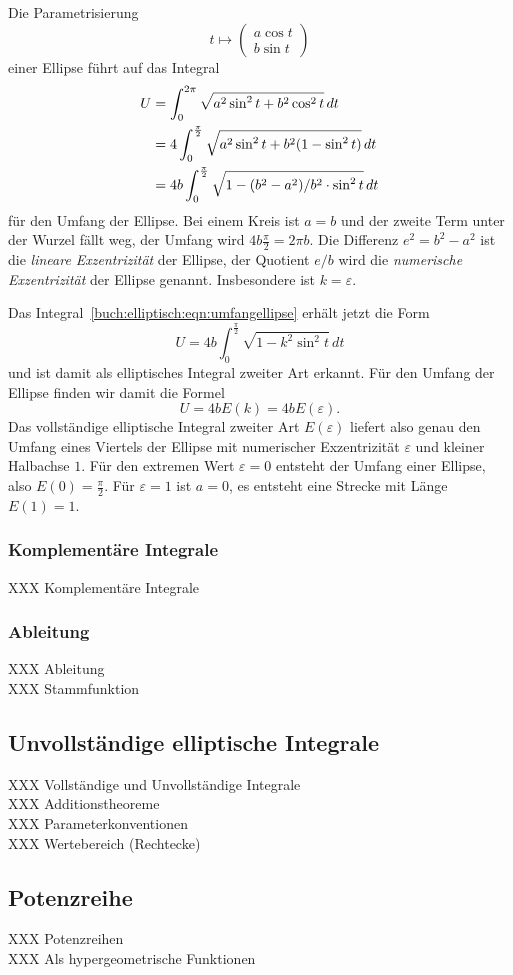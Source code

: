 Die Parametrisierung
\[
t\mapsto \begin{pmatrix}a\cos t\\ b\sin t\end{pmatrix}
\]
einer Ellipse führt auf das Integral
\begin{align}
U
&=
\int_0^{2\pi} \sqrt{a^2\sin^2t + b^2\cos^2 t}\,dt
\notag
\\
&=
4\int_0^{\frac{\pi}2}
\sqrt{a^2\sin^2t + b^2(1-\sin^2 t)}
\,dt
\notag
\\
&=
4b \int_0^{\frac{\pi}2} \sqrt{1-(b^2-a^2)/b^2\cdot \sin^2t}\,dt
\label{buch:elliptisch:eqn:umfangellipse}
\end{align}
für den Umfang der Ellipse.
Bei einem Kreis ist $a=b$ und der zweite Term unter der Wurzel fällt weg,
der Umfang wird $4b\frac{\pi}2=2\pi b$.
Die Differenz $e^2=b^2-a^2$ ist die {\em lineare Exzentrizität} der Ellipse,
%
der Quotient $e/b$ wird die {\em numerische Exzentrizität} der Ellipse
genannt.
Insbesondere ist $k = \varepsilon$.

Das Integral~\eqref{buch:elliptisch:eqn:umfangellipse} erhält jetzt die
Form
\[
U
=
4b\int_0^{\frac{\pi}2} \sqrt{1-k^2\sin^2t}\,dt
\]
und ist damit als elliptisches Integral zweiter Art erkannt.
Für den Umfang der Ellipse finden wir damit die Formel
\[
U
=
4b E(k)
=
4b E(\varepsilon).
\]
Das vollständige elliptische Integral zweiter Art $E(\varepsilon)$
liefert also genau den Umfang eines Viertels der Ellipse mit
numerischer Exzentrizität $\varepsilon$ und kleiner Halbachse $1$.
Für den extremen Wert $\varepsilon=0$ entsteht der Umfang einer Ellipse,
also $E(0)=\frac{\pi}2$.
Für $\varepsilon=1$ ist $a=0$, es entsteht eine Strecke mit Länge $E(1)=1$.

\subsubsection{Komplementäre Integrale}
XXX Komplementäre Integrale \\

\subsubsection{Ableitung}
XXX Ableitung \\
XXX Stammfunktion \\

\subsection{Unvollständige elliptische Integrale}
XXX Vollständige und Unvollständige Integrale \\
XXX Additionstheoreme \\
XXX Parameterkonventionen \\
XXX Wertebereich (Rechtecke) \\

\subsection{Potenzreihe}
XXX Potenzreihen \\
XXX Als hypergeometrische Funktionen \\


